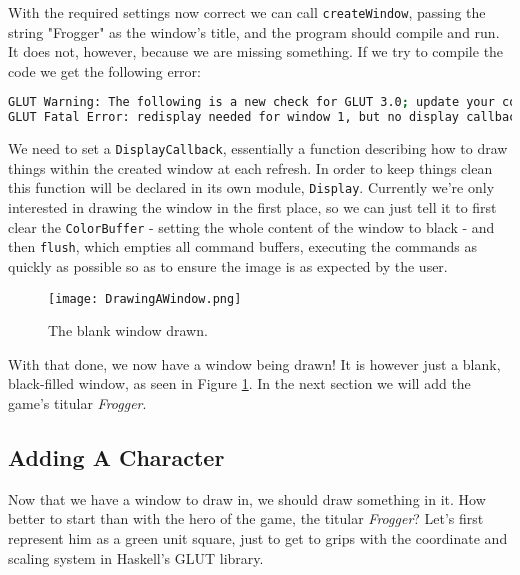 \documentclass[12pt, a4paper]{report}
\begin{document}
\par

With the required settings now correct we can call \verb|createWindow|, passing the string "Frogger" as the window's title, and the program should compile and run.
It does not, however, because we are missing something.
If we try to compile the code we get the following error:

\begin{lstlisting}[language=sh, xleftmargin=-0.1\textwidth, xrightmargin=-0.1\textwidth]
GLUT Warning: The following is a new check for GLUT 3.0; update your code.
GLUT Fatal Error: redisplay needed for window 1, but no display callback.
\end{lstlisting}

We need to set a \verb|DisplayCallback|, essentially a function describing how to draw things within the created window at each refresh.
In order to keep things clean this function will be declared in its own module, \verb|Display|.
Currently we're only interested in drawing the window in the first place, so we can just tell it to first clear the \verb|ColorBuffer| - setting the whole content of the window to black - and then \verb|flush|, which empties all command buffers, executing the commands as quickly as possible so as to ensure the image is as expected by the user.

\par

\begin{figure}[ht]
  \centering
  \caption{The blank window drawn.}
  \texttt{[image: DrawingAWindow.png]}
  \label{fig:drawingawindow}
\end{figure}

With that done, we now have a window being drawn!
It is however just a blank, black-filled window, as seen in Figure \ref{fig:drawingawindow}.
In the next section we will add the game's titular \textit{Frogger}.

\subsection{Adding A Character}

Now that we have a window to draw in, we should draw something in it.
How better to start than with the hero of the game, the titular \textit{Frogger}?
Let's first represent him as a green unit square, just to get to grips with the coordinate and scaling system in Haskell's GLUT library.

\par
\end{document}
